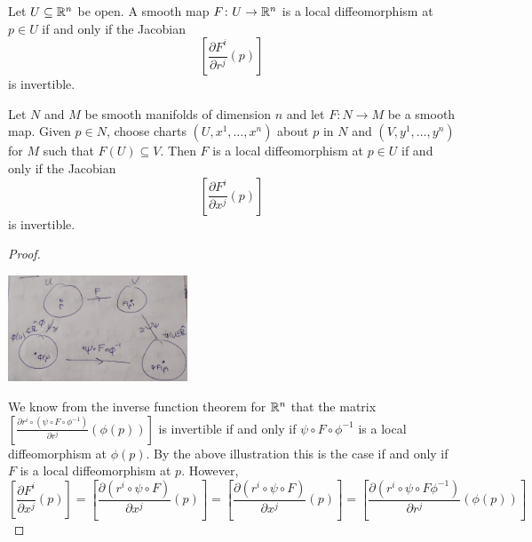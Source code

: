 \begin{frame}
  \begin{thm}
    Let $U \subseteq \mathbb R^n$ be open. 
    A smooth map $F \colon U \to \mathbb R^n$ is a local diffeomorphism
    at $p \in U$ if and only if the Jacobian
    \begin{displaymath}
      \left[
        \frac{\partial F^i}{\partial r^j}(p)
      \right]
    \end{displaymath}
    is invertible.
  \end{thm}
  \begin{thm}
    Let $N$ and $M$ be smooth manifolds of dimension $n$ and let
    $F \colon N \to M$ be a smooth map. Given $p \in N$, choose 
    charts $(U, x^1, \dots, x^n)$ about $p$ in $N$ and 
    $(V, y^1, \dots, y^n)$ for $M$ such that $F(U) \subseteq V$.
    Then $F$ is a local diffeomorphism
    at $p \in U$ if and only if the Jacobian
    \begin{displaymath}
      \left[
        \frac{\partial F^i}{\partial x^j}(p)
      \right]
    \end{displaymath}
    is invertible.
  \end{thm}
\end{frame}
\begin{frame}
  \begin{proof}
    \begin{center}
      \includegraphics[width=0.4\textwidth]{figures/coordinate_change.jpg}
    \end{center}
    We know from the inverse function theorem for $\mathbb R^n$ that 
    the matrix
    $
      \left[
        \frac{\partial r^i \circ (\psi \circ F \circ \phi^{-1})}{\partial
        r^j}(\phi(p))
      \right]
    $
    is invertible if and only if $\psi \circ F \circ \phi^{-1}$ 
    is a local diffeomorphism at $\phi(p)$. By the above illustration 
    this is the case if and only if $F$ is a local diffeomorphism at $p$.
    However,
    \begin{displaymath}
      \left[
        \frac{\partial F^i}{\partial x^j}(p) 
        \right]
      =
      \left[
        \frac{\partial (r^i \circ \psi \circ F)}{\partial x^j}(p) 
        \right]
      =
      \left[
        \frac{\partial (r^i \circ \psi \circ F)}{\partial x^j}(p) 
        \right]
      =
      \left[
        \frac{\partial (r^i \circ \psi \circ F \phi^{-1})}{\partial
        r^j}(\phi(p))
        \right]
    \end{displaymath}
  \end{proof}
\end{frame}

